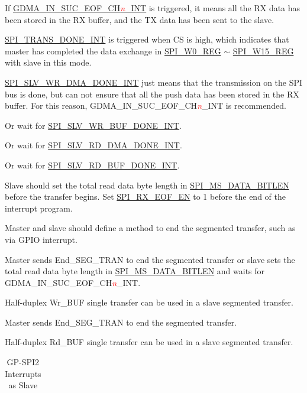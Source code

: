 \documentclass[main\_\_EN.tex]{subfiles}
\begin{document}
\begin{ThreePartTable}

\begin{TableNotes}
    \item[1] If \hyperref[int:GDMAINSUCEOFINT]{GDMA\_IN\_SUC\_EOF\_CH\textcolor{red}{\it{n}}\_INT} is triggered, it means all the RX data has been stored in the RX buffer, and the TX data has been sent to the slave. 
    \item[2] \hyperref[int:SPITRANSDONEINT]{SPI\_TRANS\_DONE\_INT} is triggered when CS is high, which indicates that master has completed the data exchange in \hyperref[regdesc:SPIW0REG]{SPI\_W0\_REG} $\sim$ \hyperref[regdesc:SPIW0REG]{SPI\_W15\_REG} with slave in this mode.
    \item[3] \hyperref[int:SPISLVWRDMADONEINT]{SPI\_SLV\_WR\_DMA\_DONE\_INT} just means that the transmission on the SPI bus is done, but can not ensure that all the push data has been stored in the RX buffer. For this reason, GDMA\_IN\_SUC\_EOF\_CH\textcolor{red}{\it{n}}\_INT is recommended.
    \item[4] Or wait for \hyperref[int:SPISLVWRBUFDONEINT]{SPI\_SLV\_WR\_BUF\_DONE\_INT}.
    \item[5] Or wait for \hyperref[int:SPISLVRDDMADONEINT]{SPI\_SLV\_RD\_DMA\_DONE\_INT}.
    \item[6] Or wait for \hyperref[int:SPISLVRDBUFDONEINT]{SPI\_SLV\_RD\_BUF\_DONE\_INT}.
    \item[7] Slave should set the total read data byte length in \hyperref[fielddesc:SPIMSDATABITLEN]{SPI\_MS\_DATA\_BITLEN} before the transfer begins. Set \hyperref[fielddesc:SPIRXEOFEN]{SPI\_RX\_EOF\_EN} to 1 before the end of the interrupt program.
    \item[8] Master and slave should define a method to end the segmented transfer, such as via GPIO interrupt.
    \item[9] Master sends End\_SEG\_TRAN to end the segmented transfer or slave sets the total read data byte length in \hyperref[fielddesc:SPIMSDATABITLEN]{SPI\_MS\_DATA\_BITLEN} and waits for GDMA\_IN\_SUC\_EOF\_CH\textcolor{red}{\it{n}}\_INT.
    \item[10] Half-duplex Wr\_BUF single transfer can be used in a slave segmented transfer.
    \item[11] Master sends End\_SEG\_TRAN to end the segmented transfer.
    \item[12] Half-duplex Rd\_BUF single transfer can be used in a slave segmented transfer.
\end{TableNotes}
\begin{longtable}[c]{|l|l|l|l|}
\caption{GP-SPI2 Interrupts as Slave}\label{Table:Slv_Int_Table}
\\\hline


\end{longtable}
\end{ThreePartTable}
\end{document}
